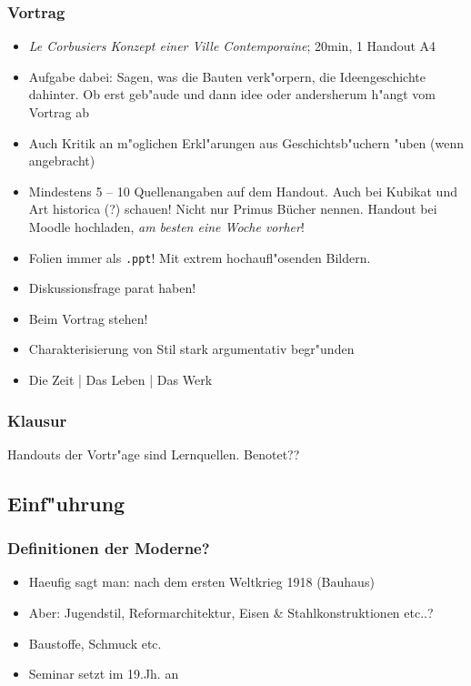 \documentclass[emulatestandardclasses]{scrartcl}
\begin{document}
\subsubsection{Vortrag}

\begin{itemize}
    \item \emph{Le Corbusiers Konzept einer Ville Contemporaine}; 20min, 1 Handout A4
    \item Aufgabe dabei: Sagen, was die Bauten verk"orpern, die Ideengeschichte dahinter. Ob erst geb"aude und dann idee oder andersherum h"angt vom Vortrag ab
    \item Auch Kritik an m"oglichen Erkl"arungen aus Geschichtsb"uchern "uben (wenn angebracht)
    \item Mindestens 5 -- 10 Quellenangaben auf dem Handout. Auch bei Kubikat und Art historica (?) schauen! Nicht nur Primus Bücher nennen. Handout bei Moodle hochladen, \emph{am besten eine Woche vorher}! 
    \item Folien immer als \texttt{.ppt}! Mit extrem hochaufl"osenden Bildern.
    \item Diskussionsfrage parat haben!
    \item Beim Vortrag stehen!
    \item Charakterisierung von Stil stark argumentativ begr"unden
    \item Die Zeit | Das Leben | Das Werk
\end{itemize}



\subsubsection{Klausur}
Handouts der Vortr"age sind Lernquellen.
Benotet??

\subsection{Einf"uhrung}
\subsubsection{Definitionen der Moderne?}
\begin{itemize}
    \item Haeufig sagt man: nach dem ersten Weltkrieg 1918 (Bauhaus)
    \item Aber: Jugendstil, Reformarchitektur, Eisen \& Stahlkonstruktionen etc..?
    \item Baustoffe, Schmuck etc.
    \item Seminar setzt im 19.Jh. an
\end{itemize}
\end{document}
